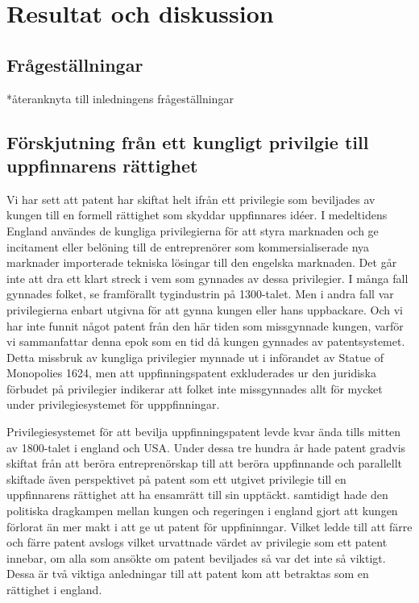 \section{Resultat och diskussion}
\label{sec:disk}



\subsection{Frågeställningar}
*återanknyta till inledningens frågeställningar



\subsection{Förskjutning från ett kungligt privilgie till uppfinnarens rättighet}
Vi har sett att patent har skiftat helt ifrån ett privilegie som beviljades av kungen till en formell rättighet som skyddar uppfinnares idéer. I medeltidens England användes de kungliga privilegierna för att styra marknaden och ge incitament eller belöning till de entreprenörer som kommersialiserade nya marknader importerade tekniska lösingar till den engelska marknaden. Det går inte att dra ett klart streck i vem som gynnades av dessa privilegier. I många fall gynnades folket, se framförallt tygindustrin på 1300-talet. Men i andra fall var privilegierna enbart utgivna för att gynna kungen eller hans uppbackare.%
Och vi har inte funnit något patent från den här tiden som missgynnade kungen, varför vi sammanfattar denna epok som en tid då kungen gynnades av patentsystemet. Detta missbruk av kungliga privilegier mynnade ut i införandet av Statue of Monopolies 1624, men att uppfinningspatent exkluderades ur den juridiska förbudet på privilegier indikerar att folket inte missgynnades allt för mycket under privilegiesystemet för upppfinningar.

Privilegiesystemet för att bevilja uppfinningspatent levde kvar ända tills mitten av 1800-talet i england och USA. Under dessa tre hundra år hade patent gradvis skiftat från att beröra entreprenörskap till att beröra uppfinnande och parallellt skiftade även perspektivet på patent som ett utgivet privilegie till en uppfinnarens rättighet att ha ensamrätt till sin upptäckt. samtidigt hade den politiska dragkampen mellan kungen och regeringen i england gjort att kungen förlorat än mer makt i att ge ut patent för uppfininngar. Vilket ledde till att färre och färre patent avslogs vilket urvattnade värdet av privilegie som ett patent innebar, om alla som ansökte om patent beviljades så var det inte så viktigt. Dessa är två viktiga anledningar till att patent kom att betraktas som en rättighet i england.

